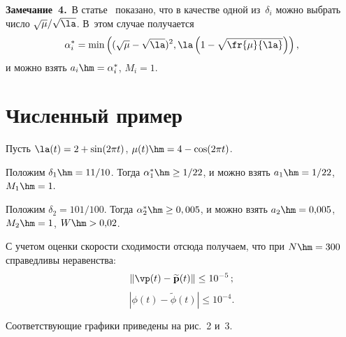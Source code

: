 \noindent
\textbf{Замечание~4.}\
    В статье~\cite{articl1} показано, что в качестве одной из~$\delta_i$  можно выбрать 
    чис\-ло  ${\sqrt{\mu}}/{\sqrt{\la}}$. 
    В~этом случае получается 
    $$
    \alpha_i^*=\min\left((\sqrt{\mu}-\sqrt{\la})^2,\la
    \left(1-\sqrt{\fr{\mu}{\la}}\right)\right),
    $$ и можно взять $a_i\hm=\alpha_i^*$, $M_i=1$.


\section{Численный пример}

Пусть $\la(t) = 2 + \sin(2\pi t)$, $\mu(t) \hm= 4- \cos(2\pi t)$.

Положим $\delta_1\hm={11}/{10}$. Тогда $\alpha_1^*\hm\ge  1/{22}$,
и можно взять $a_1\hm= 1/{22}$, $M_1\hm=1.$

Положим $\delta_2={101}/{100}$. Тогда $\alpha_2^*\hm\ge 0,005$,
и можно взять $a_2\hm=0{,}005$, $M_2\hm=1$, $W\hm>0{,}02$.

С учетом оценки скорости сходимости отсюда получаем, что при $N\hm=300$ справедливы неравенства:
\begin{equation*}
\|\vp(t)-\vwp(t)\|\le 10^{-5}\,;
\end{equation*}
\begin{equation*}
|\phi(t)-\tilde{\phi}(t)|\le 10^{-4}.
\end{equation*}

Соответствующие  графики приведены на рис.~2 и~3.





